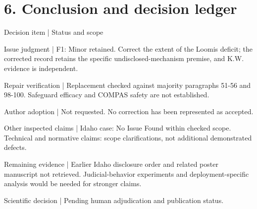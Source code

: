 \documentclass[10pt]{article}
\begin{document}
\section*{6. Conclusion and decision ledger}
Decision item | Status and scope\par
Issue judgment | F1: Minor retained. Correct the extent of the Loomis deficit; the corrected record retains the specific undisclosed-mechanism premise, and K.W. evidence is independent.\par
Repair verification | Replacement checked against majority paragraphs 51-56 and 98-100. Safeguard efficacy and COMPAS safety are not established.\par
Author adoption | Not requested. No correction has been represented as accepted.\par
Other inspected claims | Idaho case: No Issue Found within checked scope. Technical and normative claims: scope clarifications, not additional demonstrated defects.\par
Remaining evidence | Earlier Idaho disclosure order and related poster manuscript not retrieved. Judicial-behavior experiments and deployment-specific analysis would be needed for stronger claims.\par
Scientific decision | Pending human adjudication and publication status.\par
\end{document}

